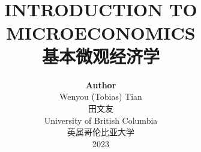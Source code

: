 
\title{ \normalsize \textsc{}
		\\ [2.0cm]
		\HRule{1.5pt} \\
		\LARGE \textbf{\uppercase{Introduction to Microeconomics}
		\HRule{2.0pt} \\ [0.6cm] \LARGE{基本微观经济学} \vspace*{10\baselineskip}}
		}
\date{}
\author{\textbf{Author} \\ 
		Wenyou (Tobias) Tian \\ 田文友 \\
		University of British Columbia \\ 英属哥伦比亚大学 \\
		2023}

\maketitle
\newpage

\tableofcontents
\newpage